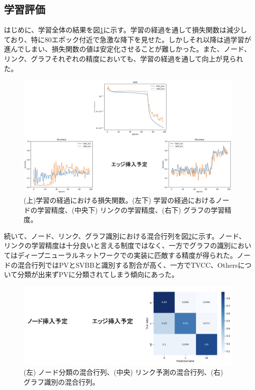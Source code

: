 \subsection{学習評価}
はじめに、学習全体の結果を図\ref{gnnoutput}に示す。学習の経過を通して損失関数は減少しており、特に80エポック付近で急激な降下を見せた。しかしそれ以降は過学習が進んでしまい、損失関数の値は安定化させることが難しかった。また、ノード、リンク、グラフそれぞれの精度においても、学習の経過を通して向上が見られた。\\
\begin{figure}[H]
	\begin{center}
 \includegraphics[keepaspectratio, scale=0.3]
 	{Figure/Flavortagging/gnnoutput.png}
 		\caption{(上)学習の経過における損失関数。(左下) 学習の経過におけるノードの学習精度、(中央下) リンクの学習精度、(右下) グラフの学習精度。}
 		\label{gnnoutput}
	\end{center}
\end{figure}
続いて、ノード、リンク、グラフ識別における混合行列を図\ref{gnncm}に示す。ノード、リンクの学習精度は十分良いと言える制度ではなく、一方でグラフの識別においてはディープニューラルネットワークでの実装に匹敵する精度が得られた。ノードの混合行列ではPVとSVBBと識別する割合が高く、一方でTVCC、Othersについて分類が出来ずPVに分類されてしまう傾向にあった。\\
\begin{figure}[H]
	\begin{center}
 \includegraphics[keepaspectratio, scale=0.3]
 	{Figure/Flavortagging/gnncm.png}
 		\caption{(左) ノード分類の混合行列、(中央) リンク予測の混合行列、(右) グラフ識別の混合行列。}
 		\label{gnncm}
	\end{center}
\end{figure}
